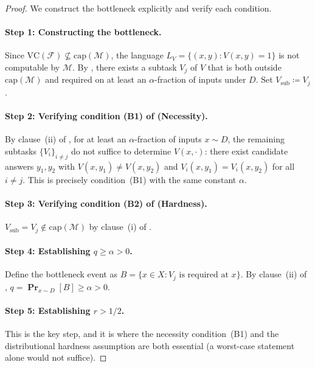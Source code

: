 \documentclass{article}
\theoremstyle{definition}
\theoremstyle{remark}
\newcommand{\VC}{\mathrm{VC}}           %
\newcommand{\calM}{\mathcal{M}}         %
\newcommand{\calF}{\mathcal{F}}         %
\renewcommand{\Pr}{\operatorname{\mathbf{Pr}}}
\begin{document}
\begin{proof}
We construct the bottleneck explicitly and verify each condition.

\paragraph{Step 1: Constructing the bottleneck.}
Since $\VC(\calF) \not\subseteq \mathrm{cap}(\calM)$, the language $L_V = \{(x,y) : V(x,y) = 1\}$ is not computable by $\calM$.
By , there exists a subtask $V_j$ of $V$ that is both outside $\mathrm{cap}(\calM)$ and required on at least an $\alpha$-fraction of inputs under $D$.
Set $V_{\mathrm{sub}} \coloneqq V_j$.

\paragraph{Step 2: Verifying condition (B1) of  (Necessity).}
By clause~(ii) of , for at least an $\alpha$-fraction of inputs $x \sim D$, the remaining subtasks $\{V_i\}_{i \neq j}$ do not suffice to determine $V(x,\cdot)$: there exist candidate answers $y_1, y_2$ with $V(x,y_1) \neq V(x,y_2)$ and $V_i(x,y_1) = V_i(x,y_2)$ for all $i \neq j$.
This is precisely condition~(B1) with the same constant $\alpha$.

\paragraph{Step 3: Verifying condition (B2) of  (Hardness).}
$V_{\mathrm{sub}} = V_j \notin \mathrm{cap}(\calM)$ by clause~(i) of .

\paragraph{Step 4: Establishing $q \geq \alpha > 0$.}
Define the bottleneck event as $B = \{x \in X : V_j \text{ is required at } x\}$.
By clause~(ii) of , $q = \Pr_{x \sim D}[B] \geq \alpha > 0$.

\paragraph{Step 5: Establishing $r > 1/2$.}
This is the key step, and it is where the necessity condition~(B1) and the distributional hardness assumption are both essential (a worst-case statement alone would not suffice).


\end{proof}
\end{document}
